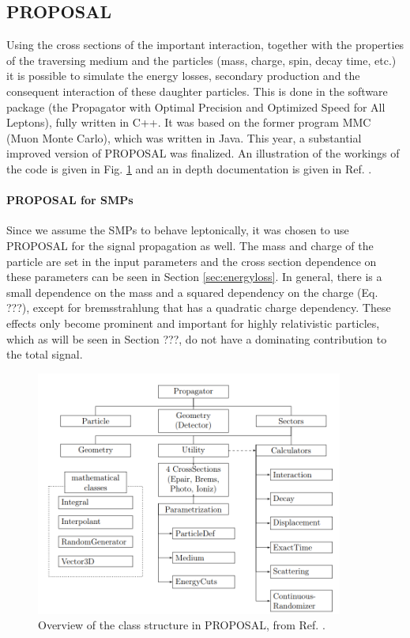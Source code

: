 \subsection{PROPOSAL}
Using the cross sections of the important interaction, together with the properties of the traversing medium and the particles (mass, charge, spin, decay time, etc.) it is possible to simulate the energy losses, secondary production and the consequent interaction of these daughter particles. This is done in the software package  (the Propagator with Optimal Precision and Optimized Speed for All Leptons), fully written in C++. It was based on the former program MMC (Muon Monte Carlo), which was written in Java. This year, a substantial improved version of PROPOSAL was finalized. An illustration of the workings of the code is given in Fig. \ref{fig:proposal} and an in depth documentation is given in Ref. \cite{Dunsch:2018nsc}.

\paragraph{PROPOSAL for SMPs}
Since we assume the SMPs to behave leptonically, it was chosen to use PROPOSAL for the signal propagation as well. The mass and charge of the particle are set in the input parameters and the cross section dependence on these parameters can be seen in Section \ref{sec:energyloss}. In general, there is a small dependence on the mass and a squared dependency on the charge (Eq. ???), except for bremsstrahlung that has a quadratic charge dependency. These effects only become prominent and important for highly relativistic particles, which as will be seen in Section ???, do not have a dominating contribution to the total signal.\\

\begin{figure}
\centering
\includegraphics[width=0.9\textwidth]{chapter6/img/proposal.png}
\caption{Overview of the class structure in PROPOSAL, from Ref. \cite{Dunsch:2018nsc}.}
\label{fig:proposal}
\end{figure}

